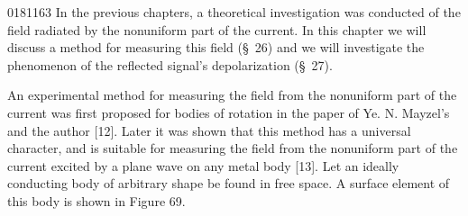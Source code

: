 \begin{scanpage}{0181}{163}
\vspace*{.16\textheight}
\bigskip
In the previous chapters, a theoretical investigation was conducted of the field radiated by the nonuniform part of the current. In this chapter we will discuss a method for measuring this field (\S~26) and we will investigate the phenomenon of the reflected signal's depolarization (\S~27).

An experimental method for measuring the field from the nonuniform part of the current was first proposed for bodies of rotation in the paper of Ye. N. Mayzel's and the author [12]. Later it was shown that this method has a universal character, and is suitable for measuring the field from the nonuniform part of the current excited by a plane wave on any metal body [13].
Let an ideally conducting body of arbitrary shape be found in free space. A surface element of this body is shown in Figure 69.
\end{scanpage}
